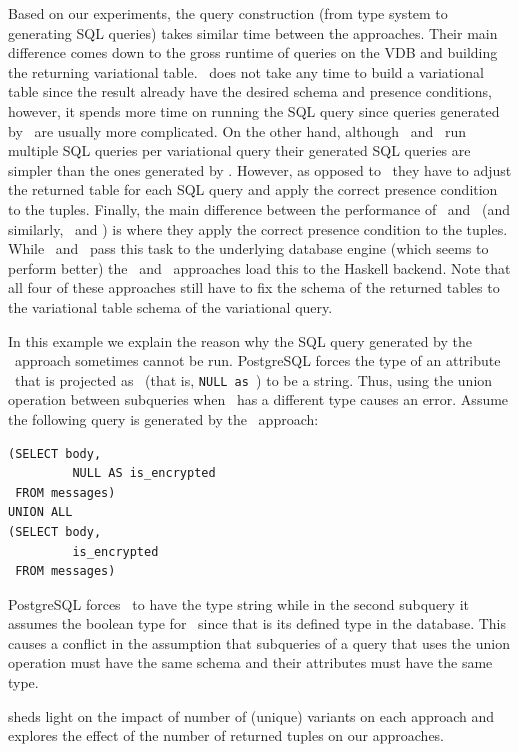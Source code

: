 %
Based on our experiments, the query construction (from type system to generating SQL queries) takes
similar time between the approaches. Their main difference comes down to the gross runtime
of queries on the VDB and building the returning variational table. 
%
\uav\ does not take any time to build a variational table since the result already have the
desired schema and presence conditions, however, it spends more time on running the 
SQL query since queries generated by \uav\ are usually more complicated. 
%
On the other hand, although \nbf\ and \ubf\ run multiple SQL queries per variational query
their generated SQL queries are simpler than the ones generated by \uav. However,
as opposed to \uav\ they have to adjust the returned table for each SQL query and apply
the correct presence condition to the tuples. 
%
Finally, the main difference between the performance of  \nbf\ and \nbfi\ (and similarly, \ubf\ and \ubfi)
is where they apply the correct presence condition to the tuples. While \nbfi\ and \ubfi\ pass this
task to the underlying database engine (which seems to perform better) the \nbf\ and \ubf\ approaches load this to the Haskell 
backend. Note that all four of these approaches still have to fix the schema of the returned
tables to the variational table schema of the variational query. 

\begin{example}
\label{eg:uav-fail}
In this example we explain the reason why the SQL query generated by the \uav\ approach
sometimes cannot be run. PostgreSQL forces the type of an attribute \vAtt\ that is projected as \nul\
(that is, \texttt{NULL as \vAtt}) to be a string. Thus, using the union operation between 
subqueries when \vAtt\ has a different type causes an error. Assume the following query is 
generated by the \uav\ approach:
%
\begin{lstlisting}[basicstyle=\footnotesize\ttfamily,columns=flexible,lineskip=0.5\baselineskip]
(SELECT body,
         NULL AS is_encrypted
 FROM messages)
UNION ALL
(SELECT body,
         is_encrypted
 FROM messages)
\end{lstlisting}
%
PostgreSQL forces \isencrypted\ to have the type string while in the second subquery it assumes the boolean 
type for \isencrypted\ since that is its defined type in the  database. This causes a conflict in the assumption
that subqueries of a query that uses the union operation must have the same schema and their 
attributes must have the same type.
\end{example}

 sheds light on the impact of number of (unique) variants on each approach and
\secref{exp-tuples} explores the effect of the number of returned tuples on our approaches. 

